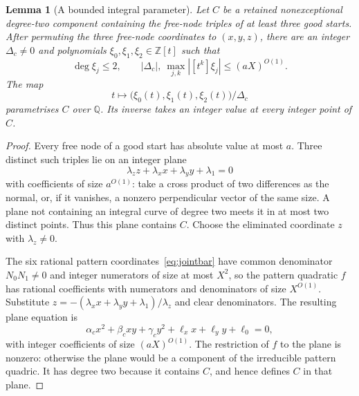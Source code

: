 \documentclass[11pt]{article}
\newtheorem{lemma}[theorem]{Lemma}
\theoremstyle{definition}
\theoremstyle{remark}
\begin{document}
\begin{lemma}[A bounded integral parameter]\label{lem:jointconicparameter}
Let $C$ be a retained nonexceptional degree-two component containing the
free-node triples of at least three good starts. After permuting the three
free-node coordinates to $(x,y,z)$, there are
an integer $\Delta_c\ne0$ and polynomials $\xi_0,\xi_1,\xi_2\in\mathbb Z[t]$ such
that
\[
 \deg \xi_j\le2,\qquad
 |\Delta_c|,\ \max_{j,k}|[t^k]\xi_j|\le(aX)^{O(1)}.
\]
The map
\[
 t\longmapsto
 \bigl(\xi_0(t),\xi_1(t),\xi_2(t)\bigr)/\Delta_c
\]
parametrises $C$ over $\mathbb Q$. Its inverse takes an integer value at
every integer point of $C$.
\end{lemma}
\begin{proof}
Every free node of a good start has absolute value at most $a$. Three distinct
such triples lie on an integer plane
\[
 \lambda_zz+\lambda_xx+\lambda_yy+\lambda_1=0
\]
with coefficients of size $a^{O(1)}$: take a cross product of two differences
as the normal, or, if it vanishes, a nonzero perpendicular vector of the same
size. A plane not containing an integral curve
of degree two meets it in at most two distinct points. Thus this plane
contains $C$. Choose the eliminated coordinate $z$ with $\lambda_z\ne0$.

The six rational pattern coordinates~\eqref{eq:jointbar} have common denominator
$N_0N_1\ne0$ and integer numerators of size at most $X^2$, so the pattern
quadratic $f$ has rational coefficients with numerators and denominators of size
$X^{O(1)}$. Substitute $z=-(\lambda_xx+\lambda_yy+\lambda_1)/\lambda_z$ and clear
denominators. The resulting plane equation is
\begin{equation}\label{eq:jointconicplane}
 \alpha_c x^2+\beta_c xy+\gamma_c y^2+\ell_xx+\ell_yy+\ell_0=0,
\end{equation}
with integer coefficients of size $(aX)^{O(1)}$. The restriction of $f$ to the plane is nonzero: otherwise
the plane would be a component of the irreducible pattern quadric.
It has degree two because it contains $C$, and hence defines $C$ in
that plane.


\end{proof}
\end{document}

